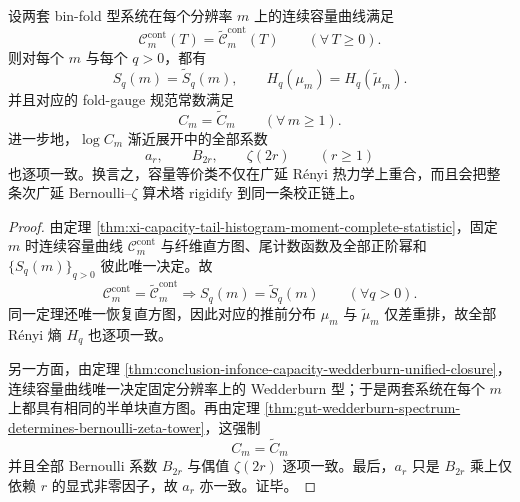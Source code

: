 \begin{theorem}\label{thm:conclusion-capacity-equivalence-thermo-arithmetic-rigidity}
设两套 bin-fold 型系统在每个分辨率 \(m\) 上的连续容量曲线满足
\[
\mathcal C_m^{\mathrm{cont}}(T)=\widetilde{\mathcal C}_m^{\mathrm{cont}}(T)
\qquad(\forall\,T\ge 0).
\]
则对每个 \(m\) 与每个 \(q>0\)，都有
\[
S_q(m)=\widetilde S_q(m),
\qquad
H_q(\mu_m)=H_q(\widetilde\mu_m).
\]
并且对应的 fold-gauge 规范常数满足
\[
C_m=\widetilde C_m
\qquad(\forall\,m\ge 1).
\]
进一步地，\(\log C_m\) 渐近展开中的全部系数
\[
a_r,
\qquad
B_{2r},
\qquad
\zeta(2r)
\qquad(r\ge 1)
\]
也逐项一致。换言之，容量等价类不仅在广延 Rényi 热力学上重合，而且会把整条次广延 Bernoulli--\(\zeta\) 算术塔 rigidify 到同一条校正链上。
\end{theorem}
\begin{proof}
由定理 \ref{thm:xi-capacity-tail-histogram-moment-complete-statistic}，固定 \(m\) 时连续容量曲线 \(\mathcal C_m^{\mathrm{cont}}\) 与纤维直方图、尾计数函数及全部正阶幂和 \(\{S_q(m)\}_{q>0}\) 彼此唯一决定。故
\[
\mathcal C_m^{\mathrm{cont}}=\widetilde{\mathcal C}_m^{\mathrm{cont}}
\Longrightarrow
S_q(m)=\widetilde S_q(m)
\qquad(\forall q>0).
\]
同一定理还唯一恢复直方图，因此对应的推前分布 \(\mu_m\) 与 \(\widetilde\mu_m\) 仅差重排，故全部 Rényi 熵 \(H_q\) 也逐项一致。

另一方面，由定理 \ref{thm:conclusion-infonce-capacity-wedderburn-unified-closure}，连续容量曲线唯一决定固定分辨率上的 Wedderburn 型；于是两套系统在每个 \(m\) 上都具有相同的半单块直方图。再由定理 \ref{thm:gut-wedderburn-spectrum-determines-bernoulli-zeta-tower}，这强制
\[
C_m=\widetilde C_m
\]
并且全部 Bernoulli 系数 \(B_{2r}\) 与偶值 \(\zeta(2r)\) 逐项一致。最后，\(a_r\) 只是 \(B_{2r}\) 乘上仅依赖 \(r\) 的显式非零因子，故 \(a_r\) 亦一致。证毕。
\end{proof}

